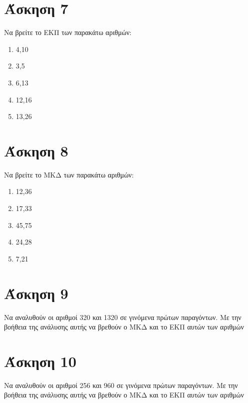 \documentclass[a4paper,10pt]{report}
\begin{document}
\section*{Άσκηση 7  \hfill \small{}}
Να βρείτε το ΕΚΠ των παρακάτω αριθμών: 
\begin{enumerate}[1)]
 \item 4,10
 \item 3,5
 \item 6,13
 \item 12,16
 \item 13,26
\end{enumerate}

\section*{Άσκηση 8  \hfill \small{}}
Να βρείτε το ΜΚΔ των παρακάτω αριθμών: 
\begin{enumerate}[1)]
 \item 12,36
 \item 17,33
 \item 45,75
 \item 24,28
 \item 7,21
\end{enumerate}

\section*{Άσκηση 9  \hfill \small{}}
Να αναλυθούν οι αριθμοί 320 και 1320 σε γινόμενα πρώτων παραγόντων. Με την βοήθεια της ανάλυσης αυτής να βρεθούν 
ο ΜΚΔ και το ΕΚΠ αυτών των αριθμών

\section*{Άσκηση 10  \hfill \small{}}
Να αναλυθούν οι αριθμοί 256 και 960 σε γινόμενα πρώτων παραγόντων. Με την βοήθεια της ανάλυσης αυτής να βρεθούν 
ο ΜΚΔ και το ΕΚΠ αυτών των αριθμών
\end{document}
